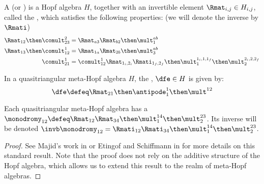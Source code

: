 \begin{definition}
A  (or ) is a Hopf algebra $H$, together with an invertible element $\Rmat_{i,j} \in
H_{i,j}$, called the , which satisfies the following
properties: (we will denote the inverse by $\Rmati$)
\begin{align}
        \label{eq:Rmat_overstrand}
        \Rmat_{12}\then\comult^{2}_{23}&=\Rmat_{a3}\Rmat_{b2}\then\mult^{ab}_1\\
        \label{eq:Rmat_understrand}
        \Rmat_{13}\then\comult^{1}_{12}&=\Rmat_{1a}\Rmat_{2b}\then\mult^{ab}_3\\
        \label{eq:Rmat_comult}
        \comult^{1}_{21} &=
                \comult^{1}_{12} \Rmat_{1_i,2_i}\Rmati_{1_f,2_f}\then
                \mult^{1_i,1,1_f}_{1}\then \mult^{2_i,2,2_f}_{2}
\end{align}
\end{definition}

\begin{definition}
        In a quasitriangular meta-Hopf algebra $H$, the ,
        $\dfe \in H$ is given by:
        \begin{equation}
                \dfe \defeq \Rmat_{21}\then\antipode^1_1 \then \mult^{12}
        \end{equation}
\end{definition}

\begin{definition}[monodromy]
        Each quasitriangular meta-Hopf algebra has a 
        $\monodromy_{12} \defeq
        \Rmat_{12}\Rmat_{34}\then\mult^{14}_{1}\then\mult^{23}_{2}$. Its
        inverse will be denoted
        $\invb\monodromy_{12} =
        \Rmati_{12}\Rmati_{34}\then\mult^{14}_{1}\then\mult^{23}_{2}$.
\end{definition}

\begin{proof}
        See Majid's work in \cite{SM} or Etingof and Schiffmann in \cite{ES}
        for more details on this standard result. Note that the proof does not
        rely on the additive structure of the Hopf algebra, which allows us to
        extend this result to the realm of meta-Hopf algebras.
\end{proof}

